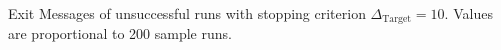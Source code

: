 Exit Messages of unsuccessful runs with stopping criterion $\Delta_{\text{Target}} = 10$. Values are proportional to 200 sample runs.
